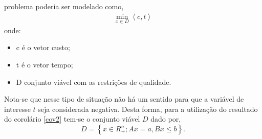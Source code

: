 problema poderia ser modelado como,
	\begin{align*}
		\min_{x \in D}\left < c,t \right >
	\end{align*}
onde:
	\begin{itemize}
		\item c \'e o vetor custo;
		\item t \'e o vetor tempo;
		\item D conjunto vi\'avel com as restri\c c\~oes de qualidade.
	\end{itemize}
Nota-se que nesse tipo de situa\c c\~ao n\~ao h\'a um sentido para que a vari\'avel de interesse $t$ seja considerada
negativa.
Desta forma, para a utiliza\c c\~ao do resultado do corol\'ario \autoref{cov2}
tem-se o conjunto vi\'avel $D$ dado por,
	\begin{equation*}%
		D = \left\{ x \in R_+^n; Ax = a, Bx \leq b \right\}.
  	\end{equation*}

